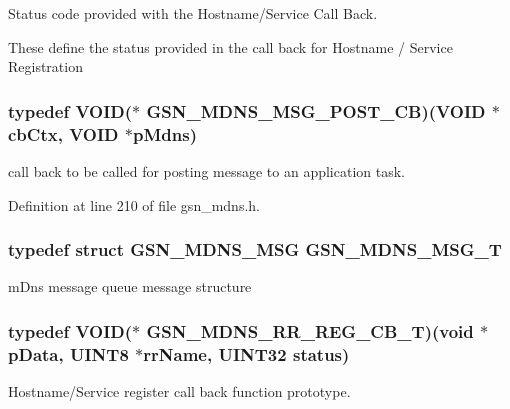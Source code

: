 Status code provided with the Hostname/Service Call Back. 

These define the status provided in the call back for Hostname / Service Registration \hypertarget{a00668_ga9bb465f57992212c58689c8cf593e0e7}{
\subsubsection[{GSN\_\-MDNS\_\-MSG\_\-POST\_\-CB}]{\setlength{\rightskip}{0pt plus 5cm}typedef VOID($\ast$ {\bf GSN\_\-MDNS\_\-MSG\_\-POST\_\-CB})(VOID $\ast$cbCtx, VOID $\ast$pMdns)}}
\label{a00668_ga9bb465f57992212c58689c8cf593e0e7}


call back to be called for posting message to an application task. 



Definition at line 210 of file gsn\_\-mdns.h.

\hypertarget{a00668_ga3216bbc2adc29e835ce14e76c1e80d44}{
\subsubsection[{GSN\_\-MDNS\_\-MSG\_\-T}]{\setlength{\rightskip}{0pt plus 5cm}typedef struct {\bf GSN\_\-MDNS\_\-MSG} {\bf GSN\_\-MDNS\_\-MSG\_\-T}}}
\label{a00668_ga3216bbc2adc29e835ce14e76c1e80d44}


mDns message queue message structure 

\hypertarget{a00668_ga9c52fae5548745f14ef4e76fb05c2526}{
\subsubsection[{GSN\_\-MDNS\_\-RR\_\-REG\_\-CB\_\-T}]{\setlength{\rightskip}{0pt plus 5cm}typedef VOID($\ast$ {\bf GSN\_\-MDNS\_\-RR\_\-REG\_\-CB\_\-T})(void $\ast$pData, {\bf UINT8} $\ast$rrName, {\bf UINT32} status)}}
\label{a00668_ga9c52fae5548745f14ef4e76fb05c2526}


Hostname/Service register call back function prototype. 



